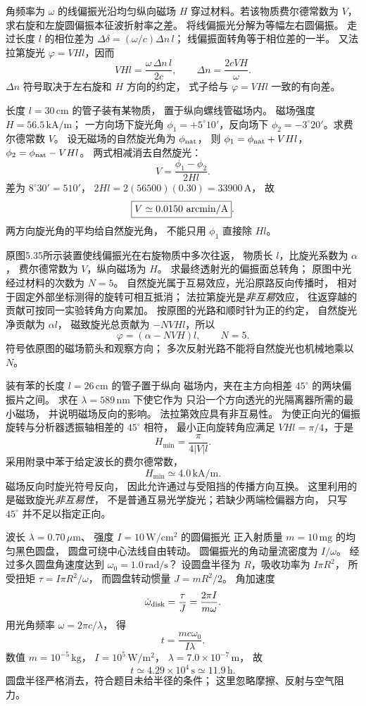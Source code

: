 角频率为 $\omega$ 的线偏振光沿均匀纵向磁场
$H$ 穿过材料。若该物质费尔德常数为 $V$，
求右旋和左旋圆偏振本征波折射率之差。
\exsolution
将线偏振光分解为等幅左右圆偏振。
走过长度 $l$ 的相位差为
$\Delta\delta=(\omega/c)\Delta n\,l$；
线偏振面转角等于相位差的一半。
又法拉第旋光 $\varphi=VHl$，因而
\[
 VHl=\frac{\omega\,\Delta n\,l}{2c},
 \qquad
 \boxed{\Delta n=\frac{2cVH}{\omega}}.
\]
\excheck $\Delta n$ 符号取决于左右旋和 $H$ 方向的约定，
式子给与 $\varphi=VHl$ 一致的有向差。

长度 $l=30\,\mathrm{cm}$ 的管子装有某物质，
置于纵向螺线管磁场内。
磁场强度 $H=56.5\,\mathrm{kA/m}$；
一方向场下旋光角
$\phi_1=+5^\circ10'$，反向场下
$\phi_2=-3^\circ20'$。求费尔德常数 $V$。
\exsolution
设无磁场的自然旋光角为 $\phi_{\rm nat}$，
则
$\phi_1=\phi_{\rm nat}+VHl$，
$\phi_2=\phi_{\rm nat}-VHl$。
两式相减消去自然旋光：
\[
 \boxed{V=\frac{\phi_1-\phi_2}{2Hl}}.
\]
差为 $8^\circ30'=510'$，
$2Hl=2(56500)(0.30)=33900\,\mathrm A$，
故
\[
 \boxed{V\simeq0.0150\ {\rm arcmin/A}}.
\]
\excheck 两方向旋光角的平均给自然旋光角，
不能只用 $\phi_1$ 直接除 $Hl$。

原图5.35所示装置使线偏振光在右旋物质中多次往返，
物质长 $l$，比旋光系数为 $\alpha$，
费尔德常数为 $V$，纵向磁场为 $H$。
求最终透射光的偏振面总转角；
原图中光经过材料的次数为 $N=5$。
\exsolution
自然旋光属于互易效应，光沿原路反向传播时，
相对于固定外部坐标测得的旋转可相互抵消；
法拉第旋光是\emph{非互易}效应，
往返穿越的贡献可按同一实验转角方向累加。
按原图的光路和顺时针为正的约定，
自然旋光净贡献为 $\alpha l$，
磁致旋光总贡献为 $-NVHl$，所以
\[
 \boxed{\varphi=(\alpha-NVH)l,\qquad N=5}.
\]
\excheck 符号依原图的磁场箭头和观察方向；
多次反射光路不能将自然旋光也机械地乘以 $N$。

装有苯的长度 $l=26\,\mathrm{cm}$ 的管子置于纵向
磁场内，夹在主方向相差 $45^\circ$ 的两块偏振片之间。
求在 $\lambda=589\,\mathrm{nm}$ 下使它作为
只沿一个方向透光的光隔离器所需的最小磁场，
并说明磁场反向的影响。
\exsolution
法拉第效应具有非互易性。
为使正向光的偏振旋转与分析器透振轴相差的
$45^\circ$ 相符，
最小正向旋转角应满足
$VHl=\pi/4$，于是
\[
 \boxed{H_{\min}=\frac{\pi}{4|V|l}}.
\]
采用附录中苯于给定波长的费尔德常数，
\[
 \boxed{H_{\min}\simeq4.0\,\mathrm{kA/m}}.
\]
磁场反向时旋光符号反向，
因此允许通过与受阻挡的传播方向互换。
\excheck 这里利用的是磁致旋光\emph{非互易性}，
不是普通互易光学旋光；若缺少两端检偏器方向，
只写 $45^\circ$ 并不足以指定正向。

波长 $\lambda=0.70\,\mu\mathrm m$、
强度 $I=10\,\mathrm{W/cm^2}$ 的圆偏振光
正入射质量 $m=10\,\mathrm{mg}$ 的均匀黑色圆盘，
圆盘可绕中心法线自由转动。
圆偏振光的角动量流密度为 $I/\omega$。
经过多久圆盘角速度达到
$\omega_0=1.0\,\mathrm{rad/s}$？
\exsolution
设圆盘半径为 $R$，吸收功率为 $I\pi R^2$，
所受扭矩
$\tau=I\pi R^2/\omega$，
而圆盘转动惯量 $J=mR^2/2$。
角加速度
\[
 \dot\omega_{\rm disk}
 =\frac{\tau}{J}
 =\frac{2\pi I}{m\omega}.
\]
用光角频率 $\omega=2\pi c/\lambda$，
得
\[
 \boxed{t=\frac{m c\omega_0}{I\lambda}}.
\]
数值 $m=10^{-5}\,\mathrm{kg}$，
$I=10^5\,\mathrm{W/m^2}$，
$\lambda=7.0\times10^{-7}\,\mathrm m$，
故
\[
 \boxed{t\simeq4.29\times10^4\,\mathrm s
 \simeq11.9\,\mathrm h}.
\]
\excheck 圆盘半径严格消去，符合题目未给半径的条件；
这里忽略摩擦、反射与空气阻力。
